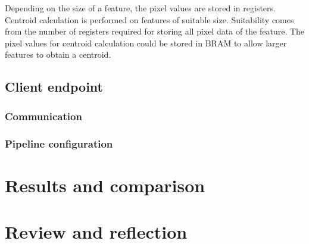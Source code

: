 \documentclass[12pt]{report}
\begin{document}
\par
Depending on the size of a feature, the pixel values are stored in registers. Centroid calculation is performed on features of suitable size. Suitability comes from the number of registers required for storing all pixel data of the feature. The pixel values for centroid calculation could be stored in BRAM to allow larger features to obtain a centroid.
\par 

\section{Client endpoint}
\subsection{Communication}
\subsection{Pipeline configuration}

\chapter{Results and comparison}

\chapter{Review and reflection}



\end{document}
